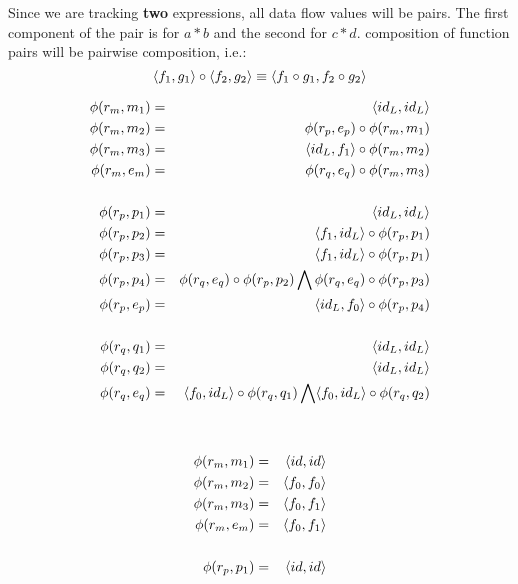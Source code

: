 \documentclass[12pt]{article}
\begin{document}
\begin{enumerate}
{Since we are tracking {\bf two} expressions, all data flow values will be pairs. The first component of the pair is for $a*b$ and the second for $c*d$. composition of function pairs will be pairwise composition, i.e.:
\[\langle f_1, g_1 \rangle \circ \langle f_2, g_2 \rangle \equiv \langle f_1 \circ g_1, f_2 \circ g_2 \rangle\]
\begin{minipage}{.60\textwidth}
\begin{eqnarray*}
  \phi(r_m, m_1) & = & \langle id_L, id_L \rangle \\
  \phi(r_m, m_2) & = & \phi(r_p, e_p)\circ\phi(r_m, m_1) \\
  \phi(r_m, m_3) & = & \langle id_L, f_1 \rangle\circ\phi(r_m, m_2) \\
  \phi(r_m, e_m) & = & \phi(r_q, e_q)\circ\phi(r_m, m_3)\\
  \\
  \phi(r_p, p_1) & = & \langle id_L, id_L \rangle \\
  \phi(r_p, p_2) & = & \langle f_1, id_L \rangle\circ\phi(r_p, p_1)\\
  \phi(r_p, p_3) & = & \langle f_1, id_L \rangle\circ\phi(r_p, p_1)\\
  \phi(r_p, p_4) & = & \phi(r_q, e_q)\circ\phi(r_p, p_2)\bigwedge\phi(r_q, e_q)\circ\phi(r_p, p_3)\\
  \phi(r_p, e_p) & = & \langle id_L,f_0 \rangle\circ\phi(r_p, p_4)\\
  \\
  \phi(r_q, q_1) & = & \langle id_L, id_L \rangle \\
  \phi(r_q, q_2) & = & \langle id_L, id_L \rangle \\
  \phi(r_q, e_q) & = & \langle f_0, id_L \rangle\circ\phi(r_q, q_1) \bigwedge \langle f_0, id_L \rangle\circ\phi(r_q, q_2)\\
\end{eqnarray*}
\end{minipage}
\begin{minipage}[t]{.05\textwidth}
  \ 
\end{minipage}
\begin{minipage}{.25\textwidth}
\begin{eqnarray*}
  \phi(r_m, m_1) & = & \pair{id, id} \\
  \phi(r_m, m_2) & = & \pair{f_0, f_0}\\
  \phi(r_m, m_3) & = & \pair{f_0, f_1}\\
  \phi(r_m, e_m) & = & \pair{f_0, f_1}\\
  \\
  \phi(r_p, p_1) & = & \pair{id, id} \\

\end{eqnarray*}
\end{minipage}}
\end{enumerate}
\end{document}
